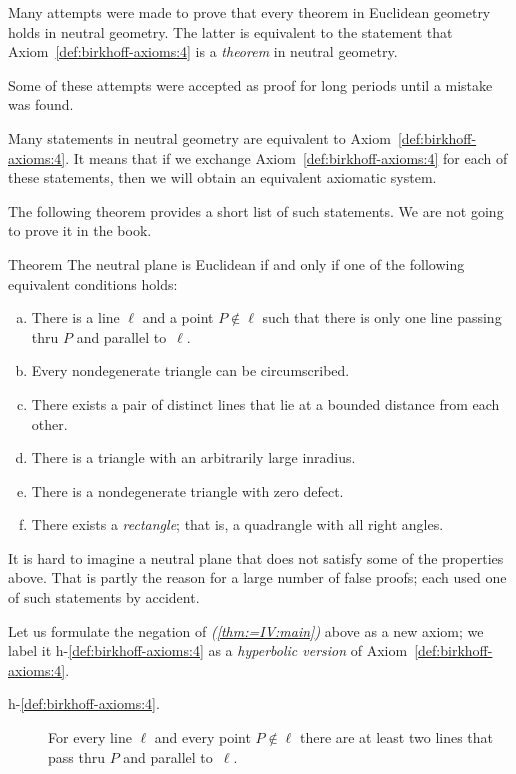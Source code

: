 Many attempts were made to prove that every theorem in Euclidean geometry holds in neutral geometry.
The latter is equivalent to the statement that Axiom~\ref{def:birkhoff-axioms:4} is a \textit{theorem} in neutral geometry.

Some of these attempts were accepted as proof for long periods until a mistake was found.

Many statements in neutral geometry are equivalent to Axiom~\ref{def:birkhoff-axioms:4}.
It means that if we exchange Axiom~\ref{def:birkhoff-axioms:4} for each of these statements, then we will obtain an equivalent axiomatic system.

The following theorem provides a short list of such statements.
We are not going to prove it in the book.

\begin{thm}{Theorem}\label{thm:=IV}
The neutral plane is Euclidean if and only if one of the following equivalent conditions holds:
\begin{enumerate}[(a)]
\item\label{thm:=IV:main} 
There is a line $\ell$ 
and a point $P\notin\ell$ 
such that there is only one line passing thru $P$ 
and parallel to~$\ell$.
\item 
Every nondegenerate triangle can be circumscribed.
\item
There exists a pair of distinct lines that lie at a bounded distance from each other.
\item
There is a triangle with an arbitrarily large inradius.
\item\label{thm:=IV:defect}
There is a nondegenerate triangle with zero defect.
\item\label{thm:=IV:rectangle}
There exists a \emph{rectangle}; that is, a quadrangle with all right angles.
\end{enumerate}
\end{thm}

It is hard to imagine a neutral plane that does not satisfy some of the properties above.
That is partly the reason for a large number of false proofs;
each used one of such statements by accident.

Let us formulate the negation of \textit{(\ref{thm:=IV:main})} above as a new axiom;
we label it h-$\!$\ref{def:birkhoff-axioms:4} as a \textit{hyperbolic version} of Axiom~\ref{def:birkhoff-axioms:4}.

\begin{framed}
\begin{description}
\item[{\rm h-$\!$\ref{def:birkhoff-axioms:4}.}]\label{def:hyperbolic-4a}  
For every line $\ell$ and every point $P\notin\ell$
there are at least two lines that pass thru $P$ and parallel to~$\ell$.
\end{description}
\end{framed}

